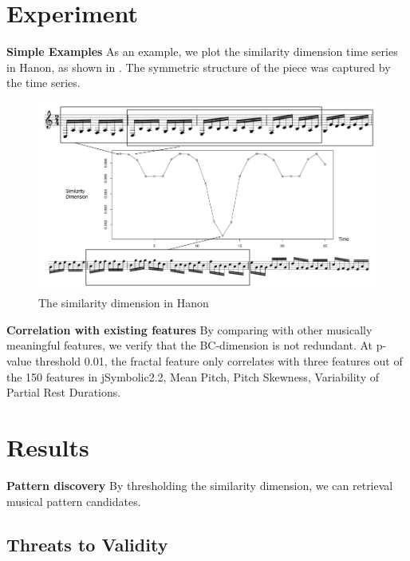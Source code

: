 \section{Experiment}




\textbf{Simple Examples}
As an example, we plot the similarity dimension time series in Hanon, as shown in . 
The symmetric structure of the piece was captured by the time series. 
\begin{figure}
  \includegraphics[width=\linewidth]{src/img/simpeg.png}
  \caption{The similarity dimension in Hanon}
  \label{fig:simpeg}
\end{figure}

\textbf{Correlation with existing features}
By comparing with other musically meaningful features, we verify that the BC-dimension is not redundant. 
At p-value threshold 0.01, the fractal feature only correlates with three features out of the 150 features in jSymbolic2.2, Mean Pitch, Pitch Skewness, Variability of Partial Rest Durations. 


\section{Results}



\textbf{Pattern discovery}
By thresholding the similarity dimension, we can retrieval musical pattern candidates. 

\subsection{Threats to Validity}

